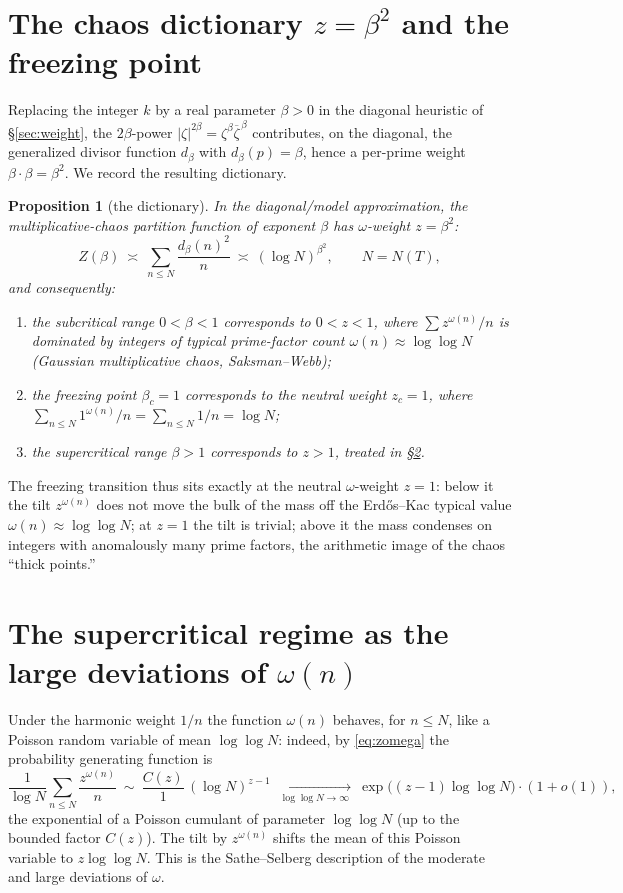 \documentclass[11pt]{amsart}
\newtheorem{proposition}[theorem]{Proposition}
\theoremstyle{definition}
\newcommand{\loglog}{\log\log}
\begin{document}
\section{The chaos dictionary $z=\beta^2$ and the freezing point}\label{sec:dict}

Replacing the integer $k$ by a real parameter $\beta>0$ in the diagonal heuristic of \S\ref{sec:weight}, the
$2\beta$-power $|\zeta|^{2\beta}=\zeta^\beta\overline{\zeta}^{\,\beta}$ contributes, on the diagonal, the
generalized divisor function $d_\beta$ with $d_\beta(p)=\beta$, hence a per-prime weight $\beta\cdot\beta=\beta^2$.
We record the resulting dictionary.

\begin{proposition}[the dictionary]\label{prop:dict}
In the diagonal/model approximation, the multiplicative-chaos partition function of exponent $\beta$ has
$\omega$-weight $z=\beta^2$:
\[
Z(\beta)\ \asymp\ \sum_{n\le N}\frac{d_\beta(n)^2}{n}\ \asymp\ (\log N)^{\beta^2},\qquad N=N(T),
\]
and consequently:
\begin{enumerate}[label=\textup{(\roman*)}]
\item the subcritical range $0<\beta<1$ corresponds to $0<z<1$, where $\sum z^{\omega(n)}/n$ is dominated by
integers of typical prime-factor count $\omega(n)\approx\loglog N$ (Gaussian multiplicative chaos,
Saksman--Webb);
\item the freezing point $\beta_c=1$ corresponds to the neutral weight $z_c=1$, where
$\sum_{n\le N}1^{\omega(n)}/n=\sum_{n\le N}1/n=\log N$;
\item the supercritical range $\beta>1$ corresponds to $z>1$, treated in \S\ref{sec:ld}.
\end{enumerate}
\end{proposition}

The freezing transition thus sits exactly at the neutral $\omega$-weight $z=1$: below it the tilt
$z^{\omega(n)}$ does not move the bulk of the mass off the Erd\H{o}s--Kac typical value $\omega(n)\approx
\loglog N$; at $z=1$ the tilt is trivial; above it the mass condenses on integers with anomalously many prime
factors, the arithmetic image of the chaos ``thick points.''

\section{The supercritical regime as the large deviations of $\omega(n)$}\label{sec:ld}

Under the harmonic weight $1/n$ the function $\omega(n)$ behaves, for $n\le N$, like a Poisson random variable of
mean $\loglog N$: indeed, by \eqref{eq:zomega} the probability generating function is
\[
\frac1{\log N}\sum_{n\le N}\frac{z^{\omega(n)}}{n}\ \sim\ \frac{C(z)}{1}\,(\log N)^{z-1}\ \xrightarrow[\ \loglog N\to\infty\ ]{}\ \exp\bigl((z-1)\loglog N\bigr)\cdot(1+o(1)),
\]
the exponential of a Poisson cumulant of parameter $\loglog N$ (up to the bounded factor $C(z)$). The tilt by
$z^{\omega(n)}$ shifts the mean of this Poisson variable to $z\loglog N$. This is the Sathe--Selberg description
of the moderate and large deviations of $\omega$.
\end{document}
